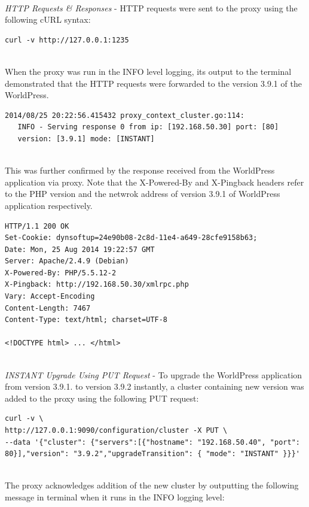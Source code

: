 \documentclass[a4paper,11pt,twoside]{article}
\begin{document}
\noindent \\
\textit{HTTP Requests \& Responses} - HTTP requests were sent to the proxy using the following cURL syntax:\smallskip
\begin{lstlisting}[language=terminal] 
curl -v http://127.0.0.1:1235 
\end{lstlisting} 

\noindent\\
When the proxy was run in the INFO level logging, its output to the terminal demonstrated that the HTTP requests were forwarded to the version 3.9.1 of the WorldPress.\smallskip

\begin{lstlisting}[language=terminal] 
2014/08/25 20:22:56.415432 proxy_context_cluster.go:114:     
   INFO - Serving response 0 from ip: [192.168.50.30] port: [80] 
   version: [3.9.1] mode: [INSTANT]
\end{lstlisting} 

\noindent\\
This was further confirmed by the response received from the WorldPress application via proxy. Note that the X-Powered-By and X-Pingback headers refer to the PHP version and the netwrok address of version 3.9.1 of WorldPress application respectively. \smallskip 

\begin{lstlisting}[language=terminal] 
HTTP/1.1 200 OK
Set-Cookie: dynsoftup=24e90b08-2c8d-11e4-a649-28cfe9158b63;
Date: Mon, 25 Aug 2014 19:22:57 GMT
Server: Apache/2.4.9 (Debian)
X-Powered-By: PHP/5.5.12-2
X-Pingback: http://192.168.50.30/xmlrpc.php
Vary: Accept-Encoding
Content-Length: 7467
Content-Type: text/html; charset=UTF-8

<!DOCTYPE html> ... </html>
\end{lstlisting} 

\noindent\\
\textit{INSTANT Upgrade Using PUT Request} - To upgrade the WorldPress application from version 3.9.1. to version 3.9.2 instantly, a cluster containing new version was added to the proxy using the following PUT request: \smallskip 

\begin{lstlisting}[language=terminal] 
curl -v \
http://127.0.0.1:9090/configuration/cluster -X PUT \
--data '{"cluster": {"servers":[{"hostname": "192.168.50.40", "port": 80}],"version": "3.9.2","upgradeTransition": { "mode": "INSTANT" }}}'
\end{lstlisting}

\noindent\\
The proxy acknowledges addition of the new cluster by outputting the following message in terminal when it runs in the INFO logging level: \smallskip 
\end{document}
